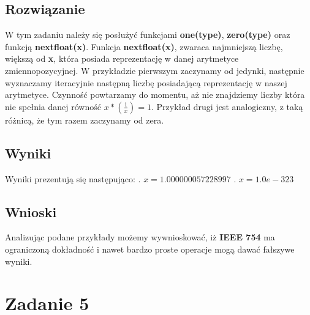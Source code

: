 \documentclass{article}
\begin{document}
\begin{center}
    \subsection{Rozwiązanie}
    \large W tym zadaniu należy się posłużyć funkcjami \textbf{one(type)}, \textbf{zero(type)} oraz funkcją \textbf{nextfloat(x)}.
     Funkcja \textbf{nextfloat(x)}, zwaraca najmniejszą liczbę, większą od \textbf{x}, która posiada reprezentację w danej arytmetyce zmiennopozycyjnej.
     W przykładzie pierwszym zaczynamy od jedynki, następnie wyznaczamy iteracyjnie następną liczbę posiadającą reprezentację w naszej arytmetyce.
     Czynność powtarzamy do momentu, aż nie znajdziemy liczby która nie spełnia danej równość \(\textit{x}*(\frac{1}{\textit{x}}) = 1\).
     Przykład drugi jest analogiczny, z taką różnicą, że tym razem zaczynamy od zera. \newpage
    \subsection{Wyniki}
    \begin{flushleft}
     \large Wyniki prezentują się następująco: . \(x = 1.000000057228997\) . \(x = 1.0e-323\)
    \end{flushleft}
    \subsection{Wnioski}
    \large Analizując podane przykłady możemy wywnioskować, iż \textbf{IEEE 754} ma ograniczoną
     dokładność i nawet bardzo proste operacje mogą dawać fałszywe wyniki.
    \section{Zadanie 5}

\end{center}
\end{document}
